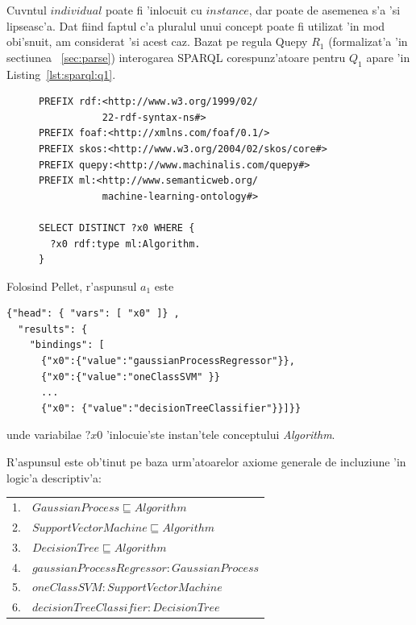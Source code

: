 \documentclass[12pt,a4paper,twoside]{report}
\begin{document}
Cuv\ia ntul $individual$ poate fi 'inlocuit cu $instance$, dar poate de asemenea s'a 'si lipseasc'a. Dat fiind faptul c'a pluralul unui concept poate fi utilizat 'in mod obi'snuit, am considerat 'si acest caz.
Bazat pe regula Quepy $R_1$ (formalizat'a 'in sectiunea ~\ref{sec:parse}) interogarea SPARQL corespunz'atoare pentru $Q_1$ apare 'in Listing~\ref{lst:sparql:q1}.

\begin{figure}
\begin{footnotesize}
\begin{lstlisting}[captionpos=b, caption=Formalizarea SPARQL a interog'arii $Q_1$., label=lst:sparql:q1,
   basicstyle=\ttfamily,frame=single]
PREFIX rdf:<http://www.w3.org/1999/02/
           22-rdf-syntax-ns#>
PREFIX foaf:<http://xmlns.com/foaf/0.1/>
PREFIX skos:<http://www.w3.org/2004/02/skos/core#>
PREFIX quepy:<http://www.machinalis.com/quepy#>
PREFIX ml:<http://www.semanticweb.org/
           machine-learning-ontology#>

SELECT DISTINCT ?x0 WHERE {
  ?x0 rdf:type ml:Algorithm.
}
\end{lstlisting}
\end{footnotesize}
\end{figure}

Folosind Pellet, r'aspunsul $a_1$ este

\begin{center}
\begin{lstlisting}[basicstyle=\footnotesize]
{"head": { "vars": [ "x0" ]} ,
  "results": {
    "bindings": [
      {"x0":{"value":"gaussianProcessRegressor"}},
      {"x0":{"value":"oneClassSVM" }} 
      ...
      {"x0": {"value":"decisionTreeClassifier"}}]}}
\end{lstlisting}
\end{center}
unde variabilae $?x0$ 'inlocuie'ste instan'tele conceptului {\it Algorithm}. 

R'aspunsul este ob'tinut pe baza urm'atoarelor axiome generale de incluziune 'in logic'a descriptiv'a:

\vspace*{0.3cm}
\begin{tabular}{ll}
1. & $GaussianProcess  \sqsubseteq Algorithm$\\
2. & $SupportVectorMachine  \sqsubseteq Algorithm$\\
3. & $DecisionTree  \sqsubseteq Algorithm$\\
4. & $gaussianProcessRegressor: GaussianProcess$\\
5. & $oneClassSVM: SupportVectorMachine$\\
6. & $decisionTreeClassifier: DecisionTree$\\
\end{tabular}
\vspace*{0.3cm}
\end{document}
